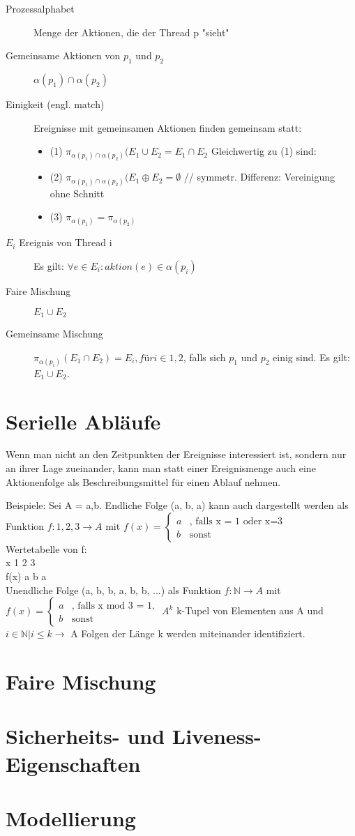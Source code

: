 \begin{description}
	\item[Prozessalphabet] Menge der Aktionen, die der Thread p "sieht"
	\item[Gemeinsame Aktionen von $p_1$ und $p_2$] $\alpha(p_1) \cap \alpha(p_2)$
	\item[Einigkeit (engl. match)] Ereignisse mit gemeinsamen Aktionen finden gemeinsam statt:
	\begin{itemize}
		\item (1) $\pi_{\alpha(p_1) \cap \alpha(p_2)}(E_1 \cup E_2 = E_1 \cap E_2$ Gleichwertig zu (1) sind:\\
		\item (2) $\pi_{\alpha(p_1) \cap \alpha(p_2)}(E_1 \oplus E_2 = \emptyset$ // symmetr. Differenz: Vereinigung ohne Schnitt
		\item (3) $\pi_{\alpha(p_1)} = \pi_{\alpha(p_2)}$
	\end{itemize}
	\item[$E_i$ Ereignis von Thread i] Es gilt: $\forall e \in E_i: aktion(e) \in \alpha(p_i)$
	\item[Faire Mischung]$E_1 \cup E_2$
	\item[Gemeinsame Mischung] $\pi_{\alpha(p_i)}(E_1 \cap E_2) = E_i, für i \in {1,2}$, falls sich $p_1$ und $p_2$ einig sind. Es gilt: $E_1 \cup E_2$.
\end{description}


\section{Serielle Abläufe}
Wenn man nicht an den Zeitpunkten der Ereignisse interessiert ist, sondern nur an ihrer Lage zueinander, kann man statt einer Ereignismenge auch eine Aktionenfolge als Beschreibungsmittel für einen Ablauf nehmen.

Beispiele: Sei A = {a,b}. Endliche Folge (a, b, a) kann auch dargestellt werden als Funktion $f: {1,2,3} \rightarrow A$ mit $f(x) = \begin{cases} a &\text{, falls x = 1 oder x=3}\\ b &\text{sonst}\end{cases}$\\
Wertetabelle von f:\\
x     1   2   3\\
f(x)  a   b   a\\

Unendliche Folge (a, b, b, a, b, b, ...) als Funktion $f: \mathbb{N} \rightarrow A$ mit $f(x) = \begin{cases} a &\text{, falls x mod 3 = 1,} \\b &\text{sonst}\end{cases}$
$A^k$ k-Tupel von Elementen aus A und \\
${i \in \mathbb{N} | i \leq k} \rightarrow$ A Folgen der Länge k werden miteinander identifiziert.


\section{Faire Mischung}

\section{Sicherheits- und Liveness-Eigenschaften}

\section{Modellierung}